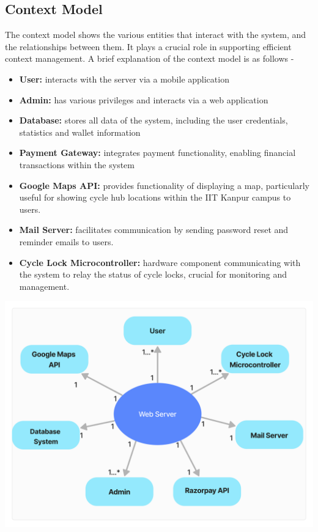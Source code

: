 \documentclass[11pt]{article}
\begin{document}
\subsection{Context Model}
The context model shows the various entities that interact with the system, and the relationships between them. It plays a crucial role in supporting efficient context management. A brief explanation of the context model is as follows - 
\begin{itemize}
  \item \textbf{User:} interacts with the server via a mobile application
  \item \textbf{Admin:} has various privileges and interacts via a web application
  \item \textbf{Database:} stores all data of the system, including the user credentials, statistics and wallet information
  \item \textbf{Payment Gateway:} integrates payment functionality, enabling financial transactions within the system
  \item \textbf{Google Maps API:} provides functionality of displaying a map, particularly useful for showing cycle hub locations within the IIT Kanpur campus to users.
  \item \textbf{Mail Server:} facilitates communication by sending password reset and reminder emails to users.
  \item \textbf{Cycle Lock Microcontroller:} hardware component communicating with the system to relay the status of cycle locks, crucial for monitoring and management.
\end{itemize}
\begin{center}
  \includegraphics[scale=0.1]{state-diagram-images/context-model.jpg}
\end{center}
\end{document}
